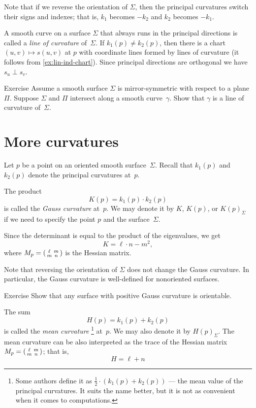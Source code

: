 Note that if we reverse the orientation of $\Sigma$, then the principal curvatures switch their signs and indexes; that is, $k_1$ becomes $-k_2$ and $k_2$ becomes $-k_1$.

A smooth curve on a surface $\Sigma$ that always runs in the principal directions is called a \emph{line of curvature} of~$\Sigma$.
If $k_1(p)\ne k_2(p)$, then there is a chart $(u,v)\mapsto s(u,v)$ at $p$ with coordinate lines formed by lines of curvature (it follows from \ref{ex:lin-ind-chart}).
Since principal directions are orthogonal we have $s_u\perp s_v$.

\begin{thm}{Exercise}\label{ex:line-of-curvature}
Assume a smooth surface $\Sigma$ is mirror-symmetric with respect to a plane $\Pi$.
Suppose $\Sigma$ and $\Pi$ intersect along a smooth curve~$\gamma$.
Show that $\gamma$ is a line of curvature of~$\Sigma$.
\end{thm}

\section{More curvatures}\label{sec:More curvatures}

Let $p$ be a point on an oriented smooth surface~$\Sigma$.
Recall that $k_1(p)$ and $k_2(p)$ denote the principal curvatures at~$p$.

The product 
\[K(p)=k_1(p)\cdot k_2(p)\]
is called the \emph{Gauss curvature} at~$p$.
We may denote it by $K$, $K(p)$, or $K(p)_\Sigma$ if we need to specify the point $p$ and the surface~$\Sigma$.

Since the determinant is equal to the product of the eigenvalues, we get
\[K=\ell\cdot n-m^2,\]
where 
$M_p\z=
(\begin{smallmatrix}
\ell&m
\\
m&n
\end{smallmatrix}
)
$ is the Hessian matrix.

Note that reversing the orientation of $\Sigma$ does not change the Gauss curvature.
In particular, the Gauss curvature is well-defined for nonoriented surfaces.

\begin{thm}{Exercise}\label{ex:gauss+orientable}
Show that any surface with positive Gauss curvature is orientable. 
\end{thm}

The sum 
\[H(p)=k_1(p)+ k_2(p)\] 
is called the \emph{mean curvature}%
\footnote{Some authors define it as $\tfrac12\cdot(k_1(p)+ k_2(p))$ --- the mean value of the principal curvatures. It suits the name better, but it is not as convenient when it comes to computations.}
at~$p$.
We may also denote it by $H(p)_\Sigma$.
The mean curvature can be also interpreted as the trace of the Hessian matrix $M_p\z=
(\begin{smallmatrix}
\ell&m
\\
m&n
\end{smallmatrix}
)$;
that is,
\[H=\ell+n\] 

